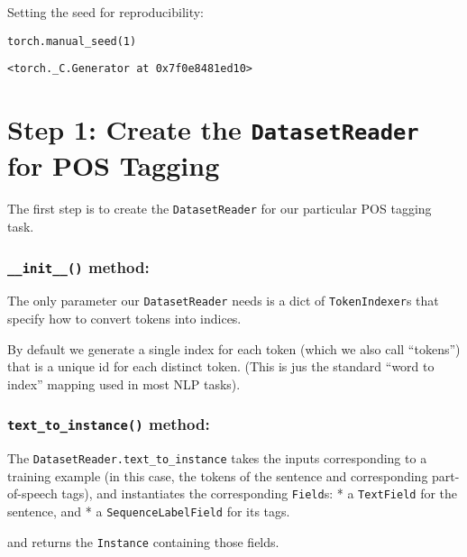 \documentclass[
]{article}
\begin{document}
Setting the seed for reproducibility:

\begin{verbatim}
torch.manual_seed(1)
\end{verbatim}

\begin{verbatim}
<torch._C.Generator at 0x7f0e8481ed10>
\end{verbatim}

\hypertarget{step-1-create-the-datasetreader-for-pos-tagging}{%
\section{\texorpdfstring{Step 1: Create the \texttt{DatasetReader} for
POS
Tagging}{Step 1: Create the DatasetReader for POS Tagging}}\label{step-1-create-the-datasetreader-for-pos-tagging}}

The first step is to create the \texttt{DatasetReader} for our
particular POS tagging task.

\hypertarget{init__-method}{%
\subsubsection{\texorpdfstring{\texttt{\_\_init\_\_()}
method:}{\_\_init\_\_() method:}}\label{init__-method}}

The only parameter our \texttt{DatasetReader} needs is a dict of
\texttt{TokenIndexer}s that specify how to convert tokens into indices.

By default we generate a single index for each token (which we also call
``tokens'') that is a unique id for each distinct token. (This is jus
the standard ``word to index'' mapping used in most NLP tasks).

\hypertarget{text_to_instance-method}{%
\subsubsection{\texorpdfstring{\texttt{text\_to\_instance()}
method:}{text\_to\_instance() method:}}\label{text_to_instance-method}}

The \texttt{DatasetReader.text\_to\_instance} takes the inputs
corresponding to a training example (in this case, the tokens of the
sentence and corresponding part-of-speech tags), and instantiates the
corresponding \texttt{Field}s: * a \texttt{TextField} for the sentence,
and * a \texttt{SequenceLabelField} for its tags.

and returns the \texttt{Instance} containing those fields.
\end{document}
